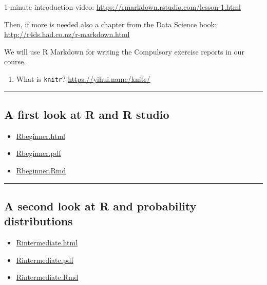 \documentclass[]{article}
\providecommand{\tightlist}{%
  \setlength{\itemsep}{0pt}\setlength{\parskip}{0pt}}
\begin{document}
1-minute introduction video:
\url{https://rmarkdown.rstudio.com/lesson-1.html}

Then, if more is needed also a chapter from the Data Science book:
\url{http://r4ds.had.co.nz/r-markdown.html}

We will use R Markdown for writing the Compulsory exercise reports in
our course.

\begin{enumerate}
\def\labelenumi{\arabic{enumi})}
\setcounter{enumi}{5}
\tightlist
\item
  What is \texttt{knitr}? \url{https://yihui.name/knitr/}
\end{enumerate}

\begin{center}\rule{0.5\linewidth}{\linethickness}\end{center}

\hypertarget{a-first-look-at-r-and-r-studio}{%
\subsection{A first look at R and R
studio}\label{a-first-look-at-r-and-r-studio}}

\begin{itemize}
\tightlist
\item
  \href{https://www.math.ntnu.no/emner/TMA4268/2019v/1Intro/Rbeginner.html}{Rbeginner.html}
\item
  \href{https://www.math.ntnu.no/emner/TMA4268/2019v/1Intro/Rbeginner.pdf}{Rbeginner.pdf}
\item
  \href{https://www.math.ntnu.no/emner/TMA4268/2019v/1Intro/Rbeginner.Rmd}{Rbeginner.Rmd}
\end{itemize}

\begin{center}\rule{0.5\linewidth}{\linethickness}\end{center}

\hypertarget{a-second-look-at-r-and-probability-distributions}{%
\subsection{A second look at R and probability
distributions}\label{a-second-look-at-r-and-probability-distributions}}

\begin{itemize}
\tightlist
\item
  \href{https://www.math.ntnu.no/emner/TMA4268/2019v/1Intro/Rintermediate.html}{Rintermediate.html}
\item
  \href{https://www.math.ntnu.no/emner/TMA4268/2019v/1Intro/Rintermediate.pdf}{Rintermediate.pdf}
\item
  \href{https://www.math.ntnu.no/emner/TMA4268/2019v/1Intro/Rintermediate.Rmd}{Rintermediate.Rmd}
\end{itemize}
\end{document}
